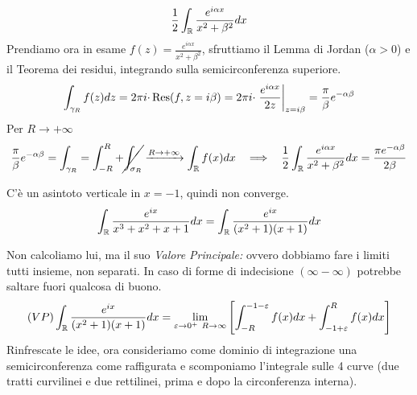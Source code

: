 \begin{equation*}
\frac{1}{2}\int _{\mathbb{R} }\frac{e^{i\alpha x}}{x^{2} +\beta ^{2}} dx
\end{equation*}Prendiamo ora in esame $f(z)=\frac{e^{i\alpha x}}{x^{2} +\beta ^{2}}$, sfruttiamo il Lemma di Jordan ($\alpha  >0$) e il Teorema dei residui, integrando sulla semicirconferenza superiore.
\begin{equation*}
\int _{\gamma _{R}} f( z) dz=2\pi i\cdotp \operatorname{Res} ( f,z=i\beta ) =2\pi i\cdotp \left. \frac{e^{i\alpha x}}{2z}\right| _{z=i\beta } =\frac{\pi }{\beta } e^{-\alpha \beta }
\end{equation*}
Per $R\rightarrow +\infty $
\begin{equation*}
\frac{\pi }{\beta } e^{-\alpha \beta } =\int _{\gamma _{R}} =\int ^{R}_{-R} +\cancel{\int _{\sigma _{R}}}\xrightarrow{R\rightarrow +\infty }\int _{\RR } f( x) dx\ \ \implies \ \ \frac{1}{2}\int _{\RR }\frac{e^{i\alpha x}}{x^{2} +\beta ^{2}} dx=\frac{\pi e^{-\alpha \beta }}{2\beta }
\end{equation*}
\Soluzione

C'è un asintoto verticale in $x=-1$, quindi non converge.\begin{equation*}
\int _{\mathbb{R} }\frac{e^{ix}}{x^{3} +x^{2} +x+1} dx=\int _{\mathbb{R} }\frac{e^{ix}}{(x^{2} +1)(x+1)} dx
\end{equation*}

Non calcoliamo lui, ma il suo \textit{Valore Principale:} ovvero dobbiamo fare i limiti tutti insieme, non separati. In caso di forme di indecisione $( \infty -\infty )$ potrebbe saltare fuori qualcosa di buono.
\begin{equation*}
( VP)\int _{\mathbb{R} }\frac{e^{ix}}{(x^{2} +1)(x+1)} dx=\lim _{\varepsilon \rightarrow 0^{+} \ R\rightarrow \infty }\left[\int ^{-1-\varepsilon }_{-R} f(x)dx+\int ^{R}_{-1+\varepsilon } f(x)dx\right]
\end{equation*}
Rinfrescate le idee, ora consideriamo come dominio di integrazione una semicirconferenza come raffigurata e scomponiamo l'integrale sulle 4 curve (due tratti curvilinei e due rettilinei, prima e dopo la circonferenza interna).


